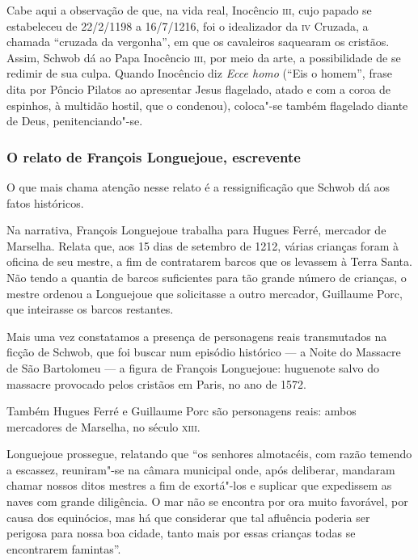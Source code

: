 \documentclass[12pt]{extarticle}
\begin{document}

Cabe aqui a observação de que, na vida real, Inocêncio \textsc{iii}, cujo papado
se estabeleceu de 22/2/1198 a 16/7/1216, foi o idealizador da \textsc{iv}
Cruzada, a chamada ``cruzada da vergonha'', em que os cavaleiros
saquearam os cristãos. Assim, Schwob dá ao Papa Inocêncio \textsc{iii}, por meio
da arte, a possibilidade de se redimir de sua culpa. Quando Inocêncio
diz \textit{Ecce homo} (``Eis o homem'', frase dita por Pôncio Pilatos ao
apresentar Jesus flagelado, atado e com a coroa de espinhos, à
multidão hostil, que o condenou), coloca"-se também flagelado diante de
Deus, penitenciando"-se.


\subsubsection{O relato de François Longuejoue, escrevente}

O que mais chama atenção nesse relato é a ressignificação que Schwob dá
aos fatos históricos.

Na narrativa, François Longuejoue trabalha para Hugues Ferré, mercador
de Marselha. Relata que, aos 15 dias de setembro de 1212, várias
crianças foram à oficina de seu mestre, a fim de contratarem barcos que
os levassem à Terra Santa. Não tendo a quantia de barcos suficientes
para tão grande número de crianças, o mestre ordenou a Longuejoue que
solicitasse a outro mercador, Guillaume Porc, que inteirasse os barcos
restantes.

Mais uma vez constatamos a presença de personagens reais transmutados na
ficção de Schwob, que foi buscar num episódio histórico --- a Noite do
Massacre de São Bartolomeu ---  a figura de François Longuejoue:
huguenote salvo do massacre provocado pelos cristãos em Paris, no ano de
1572.

Também Hugues Ferré e Guillaume Porc são personagens reais: ambos
mercadores de Marselha, no século \textsc{xiii}.

Longuejoue prossegue, relatando que ``os senhores almotacéis, com razão
temendo a escassez, reuniram"-se na câmara municipal onde, após
deliberar, mandaram chamar nossos ditos mestres a fim de exortá"-los e
suplicar que expedissem as naves com grande diligência. O mar não se
encontra por ora muito favorável, por causa dos equinócios, mas há que
considerar que tal afluência poderia ser perigosa para nossa boa cidade,
tanto mais por essas crianças todas se encontrarem famintas''.
\end{document}
